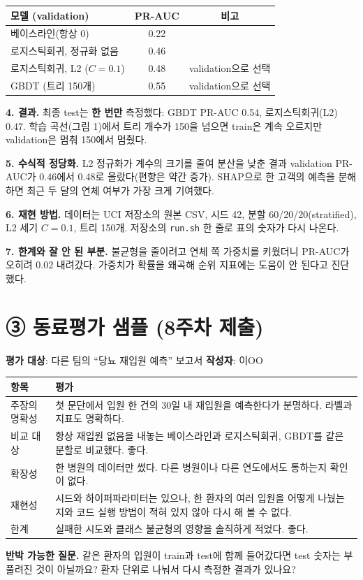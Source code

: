\documentclass[11pt]{article}
\begin{document}
\begin{center}\small
\begin{tabular}{@{}lcc@{}}\toprule
모델 (validation) & PR-AUC & 비고 \\\midrule
베이스라인(항상 0) & 0.22 & \\
로지스틱회귀, 정규화 없음 & 0.46 & \\
로지스틱회귀, L2 ($C=0.1$) & 0.48 & validation으로 선택 \\
GBDT (트리 150개) & 0.55 & validation으로 선택 \\\bottomrule
\end{tabular}
\end{center}

\noindent\textbf{4. 결과.} 최종 test는 \textbf{한 번만} 측정했다: GBDT PR-AUC 0.54, 로지스틱회귀(L2) 0.47. 학습 곡선(그림 1)에서 트리 개수가 150을 넘으면 train은 계속 오르지만 validation은 멈춰 150에서 멈췄다.

\noindent\textbf{5. 수식적 정당화.} L2 정규화가 계수의 크기를 줄여 분산을 낮춘 결과 validation PR-AUC가 0.46에서 0.48로 올랐다(편향은 약간 증가). SHAP으로 한 고객의 예측을 분해하면 최근 두 달의 연체 여부가 가장 크게 기여했다.

\noindent\textbf{6. 재현 방법.} 데이터는 UCI 저장소의 원본 CSV, 시드 42, 분할 60/20/20(stratified), L2 세기 $C=0.1$, 트리 150개. 저장소의 \texttt{run.sh} 한 줄로 표의 숫자가 다시 나온다.

\noindent\textbf{7. 한계와 잘 안 된 부분.} 불균형을 줄이려고 연체 쪽 가중치를 키웠더니 PR-AUC가 오히려 0.02 내려갔다. 가중치가 확률을 왜곡해 순위 지표에는 도움이 안 된다고 진단했다.

\newpage
\section*{③ 동료평가 샘플 (8주차 제출)}
\noindent\textbf{평가 대상}: 다른 팀의 ``당뇨 재입원 예측'' 보고서 \quad \textbf{작성자}: 이OO

\begin{center}\small
\begin{tabular}{@{}p{3.4cm}p{9cm}@{}}\toprule
항목 & 평가 \\\midrule
주장의 명확성 & 첫 문단에서 입원 한 건의 30일 내 재입원을 예측한다가 분명하다. 라벨과 지표도 명확하다. \\
비교 대상 & 항상 재입원 없음을 내놓는 베이스라인과 로지스틱회귀, GBDT를 같은 분할로 비교했다. 좋다. \\
확장성 & 한 병원의 데이터만 썼다. 다른 병원이나 다른 연도에서도 통하는지 확인이 없다. \\
재현성 & 시드와 하이퍼파라미터는 있으나, 한 환자의 여러 입원을 어떻게 나눴는지와 코드 실행 방법이 적혀 있지 않아 다시 해 볼 수 없다. \\
한계 & 실패한 시도와 클래스 불균형의 영향을 솔직하게 적었다. 좋다. \\
\bottomrule\end{tabular}\end{center}

\noindent\textbf{반박 가능한 질문.} 같은 환자의 입원이 train과 test에 함께 들어갔다면 test 숫자는 부풀려진 것이 아닐까요? 환자 단위로 나눠서 다시 측정한 결과가 있나요?
\end{document}
